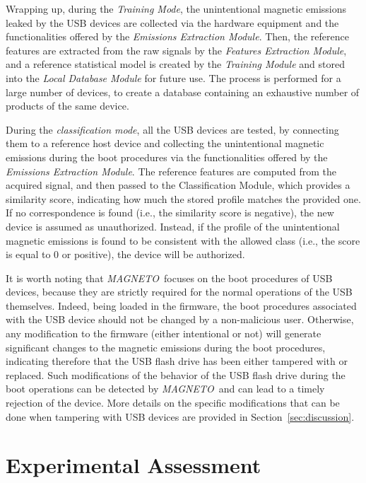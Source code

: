 \documentclass[acmsmall, authorversion]{acmart}
\newcommand{\sol}{\emph{MAGNETO}}
\begin{document}
Wrapping up, during the \emph{Training Mode}, the unintentional magnetic emissions leaked by the USB devices are collected via the hardware equipment and the functionalities offered by the \emph{Emissions Extraction Module}. Then, the reference features are extracted from the raw signals by the \emph{Features Extraction Module}, and a reference statistical model is created by the \emph{Training Module} and stored into the \emph{Local Database Module} for future use. 
The process is performed for a large number of devices, to create a database containing an exhaustive number of products of the same device.

During the \emph{classification mode}, all the USB devices are tested, by connecting them to a reference host device and collecting the unintentional magnetic emissions during the boot procedures via the functionalities offered by the \emph{Emissions Extraction Module}. The reference features are computed from the acquired signal, and then passed to the Classification Module, which provides a similarity score, indicating how much the stored profile matches the provided one. 
If no correspondence is found (i.e., the similarity score is negative), the new device is assumed as unauthorized. Instead, if the profile of the unintentional magnetic emissions is found to be consistent with the allowed class (i.e., the score is equal to 0 or positive), the device will be authorized.

It is worth noting that \sol\ focuses on the boot procedures of USB devices, because they are strictly required for the normal operations of the USB themselves. Indeed, being loaded in the firmware, the boot procedures associated with the USB device should not be changed by a non-malicious user. Otherwise,  any modification to the firmware (either intentional or not) will generate significant changes to the magnetic emissions during the boot procedures, indicating therefore that the USB flash drive has been either tampered with or replaced. Such modifications of the behavior of the USB flash drive during the boot operations can be detected by \sol\ and can lead to a timely rejection of the device. More details on the specific modifications that can be done when tampering with USB devices are provided in Section~\ref{sec:discussion}.

\section{Experimental Assessment}
\label{sec:experiments}
\end{document}
